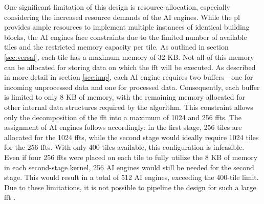 One significant limitation of this design is resource allocation, especially considering the increased resource demands of the AI engines. While the \ac{pl} provides ample resources to implement multiple instances of identical building blocks, the AI engines face constraints due to the limited number of available tiles and the restricted memory capacity per tile. As outlined in section \ref{sec:versal}, each tile has a maximum memory of 32 KB. Not all of this memory can be allocated for storing data on which the \ac{fft} will be executed. As described in more detail in section \ref{sec:imp}, each AI engine requires two buffers—one for incoming unprocessed data and one for processed data. Consequently, each buffer is limited to only 8 KB of memory, with the remaining memory allocated for other internal data structures required by the algorithm. This constraint allows only the decomposition of the \ac{fft} into a maximum of 1024 and 256 \ac{fft}s. The assignment of AI engines follows accordingly: in the first stage, 256 tiles are allocated for the 1024 \ac{fft}s, while the second stage would ideally require 1024 tiles for the 256 \ac{fft}s. With only 400 tiles available, this configuration is infeasible. Even if four 256 \ac{fft}s were placed on each tile to fully utilize the 8 KB of memory in each second-stage kernel, 256 AI engines would still be needed for the second stage. This would result in a total of 512 AI engines, exceeding the 400-tile limit. Due to these limitations, it is not possible to pipeline the design for such a large \ac{fft} \cite{AMD_a_aie}.

